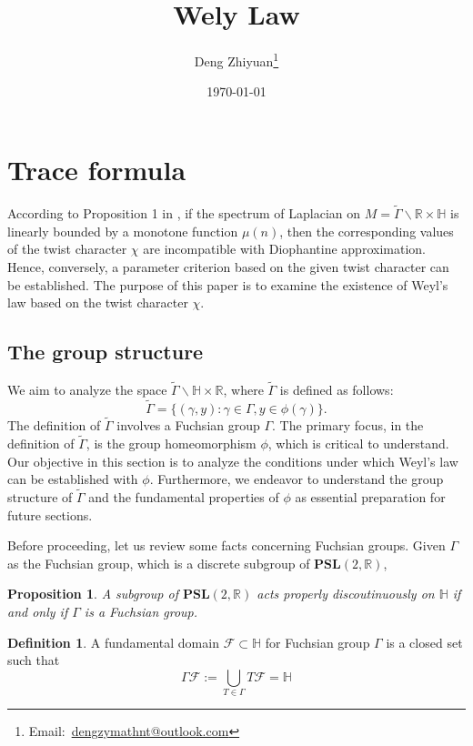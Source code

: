 \documentclass[12pt,a4paper,english]{article}
\title{Wely Law}
\date{\today}
\author{Deng Zhiyuan\footnote{Email:\ \href{mailto:dengzymathnt@outlook.com}{dengzymathnt@outlook.com}}}
\theoremstyle{plain}
\newtheorem{prop}[thm]{Proposition}
\theoremstyle{definition}
\newtheorem{defi}{Definition}
\theoremstyle{remark}
\begin{document}
\maketitle
\newpage

\tableofcontents
\newpage

\section{Trace formula}

According to Proposition 1 in \cite{hoffmann1991cuspidal}, if the spectrum of Laplacian on $M=\tilde{\Gamma}\backslash\mathbb{R}\times\mathbb{H}$ is linearly bounded by a monotone function $\mu(n)$, then the corresponding values of the twist character $\chi$ are incompatible with Diophantine approximation. Hence, conversely, a parameter criterion based on the given twist character can be established. The purpose of this paper is to examine the existence of Weyl's law based on the twist character $\chi$.

\subsection{The group structure}
We aim to analyze the space $\tilde{\Gamma}\backslash \mathbb{H}\times \mathbb{R}$, where $\tilde{\Gamma}$ is defined as follows: 
\begin{equation}\label{biggergamma}
    \tilde{\Gamma}=\{(\gamma, y): \gamma\in \Gamma, y\in \phi(\gamma)\}.
\end{equation}
The definition of $\tilde{\Gamma}$ involves a Fuchsian group $\Gamma$. The primary focus, in the definition of $\tilde{\Gamma}$, is the group homeomorphism $\phi$, which is critical to understand. Our objective in this section is to analyze the conditions under which Weyl's law can be established with $\phi$. Furthermore, we endeavor to understand the group structure of $\tilde{\Gamma}$ and the fundamental properties of $\phi$ as essential preparation for future sections.


Before proceeding, let us review some facts concerning Fuchsian groups. Given $\Gamma$ as the Fuchsian group, which is a discrete subgroup of $\textbf{PSL}(2,\mathbb{R})$, 
\begin{prop}
    A subgroup of $\textbf{PSL}(2,\mathbb{R})$ acts properly discoutinuously on $\mathbb{H}$ if and only if $\Gamma$ is a Fuchsian group.
\end{prop}
\begin{defi}
    A fundamental domain $\mathcal{F}\subset \mathbb{H}$ for Fuchsian group $\Gamma$ is a closed set such that 
    \begin{equation*}
        \Gamma\mathcal{F}:=\bigcup_{T\in\Gamma}T\mathcal{F}=\mathbb{H}
    \end{equation*}
\end{defi}
\end{document}
